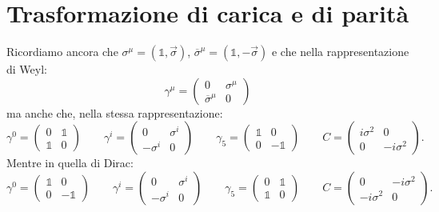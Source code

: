 \section{Trasformazione di carica e di parità}

Ricordiamo ancora che $\sigma^\mu = (\mathbb{1},\vec{\sigma})$, $\overline{\sigma}^\mu = (\mathbb{1},-\vec{\sigma})$ e che nella rappresentazione di Weyl:
\begin{equation}
    \gamma^\mu = \begin{pmatrix}
        0 & \sigma^\mu \\
        \overline{\sigma}^\mu & 0
    \end{pmatrix}
\end{equation}
ma anche che, nella stessa rappresentazione:
\begin{equation*}
    \gamma^0 = \begin{pmatrix}
        0 & \mathbb{1} \\
        \mathbb{1} & 0
    \end{pmatrix} \qquad \gamma^i = \begin{pmatrix}
        0 & \sigma^i \\
        -\sigma^i & 0
    \end{pmatrix} \qquad \gamma_5 = \begin{pmatrix}
        \mathbb{1} & 0 \\
        0 & -\mathbb{1}  
    \end{pmatrix} \qquad C = \begin{pmatrix}
        i\sigma^2 & 0 \\
        0 & -i\sigma^2
    \end{pmatrix}.
\end{equation*}
Mentre in quella di Dirac:
\begin{equation*}
    \gamma^0 = \begin{pmatrix}
        \mathbb{1} & 0 \\
        0 & -\mathbb{1}
    \end{pmatrix} \qquad \gamma^i = \begin{pmatrix}
        0 & \sigma^i \\
        -\sigma^i & 0
    \end{pmatrix} \qquad \gamma_5 = \begin{pmatrix}
        0 & \mathbb{1} \\
        \mathbb{1} & 0
    \end{pmatrix} \qquad C = \begin{pmatrix}
        0 & -i\sigma^2 \\
        -i\sigma^2 & 0
    \end{pmatrix}.
\end{equation*}
